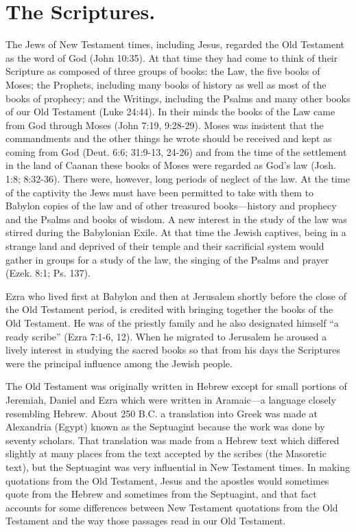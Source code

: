 \section{The Scriptures.}

The Jews of New Testament times, including Jesus, regarded the Old Testament as the word of God (John 10:35). At that time they had come to think of their Scripture as composed of three groups of books: the Law, the five books of Moses; the Prophets, including many books of history as well as most of the books of prophecy; and the Writings, including the Psalms and many other books of our Old Testament (Luke 24:44). In their minds the books of the Law came from God through Moses (John 7:19, 9:28-29). Moses was insistent that the commandments and the other things he wrote should be received and kept as coming from God (Deut. 6:6; 31:9-13, 24-26) and from the time of the settlement in the land of Caanan these books of Moses were regarded as God's law (Josh. 1:8; 8:32-36). There were, however, long periods of neglect of the law. At the time of the captivity the Jews must have been permitted to take with them to Babylon copies of the law and of other treasured books---history and prophecy and the Psalms and books of wisdom. A new interest in the study of the law was stirred during the Babylonian Exile. At that time the Jewish captives, being in a strange land and deprived of their temple and their sacrificial system would gather in groups for a study of the law, the singing of the Psalms and prayer (Ezek. 8:1; Ps. 137).

Ezra who lived first at Babylon and then at Jerusalem shortly before the close of the Old Testament period, is credited with bringing together the books of the Old Testament. He was of the priestly family and he also designated himself ``a ready scribe'' (Ezra 7:1-6, 12). When he migrated to Jerusalem he aroused a lively interest in studying the sacred books so that from his days the Scriptures were the principal influence among the Jewish people.

The Old Testament was originally written in Hebrew except for small portions of Jeremiah, Daniel and Ezra which were written in Aramaic---a language closely resembling Hebrew. About 250 B.C. a translation into Greek was made at Alexandria (Egypt) known as the Septuagint because the work was done by seventy scholars. That translation was made from a Hebrew text which differed slightly at many places from the text accepted by the scribes (the Masoretic text), but the Septuagint was very influential in New Testament times. In making quotations from the Old Testament, Jesus and the apostles would sometimes quote from the Hebrew and sometimes from the Septuagint, and that fact accounts for some differences between New Testament quotations from the Old Testament and the way those passages read in our Old Testament.

